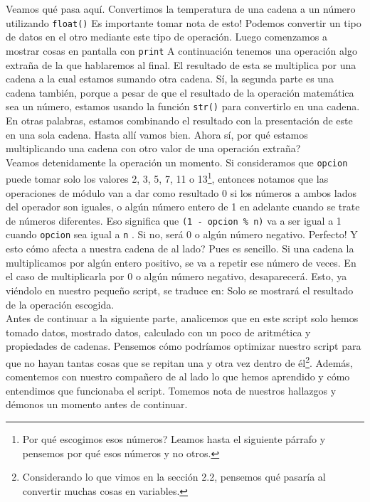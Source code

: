 \documentclass[10pt,letterpaper]{article}
\newcommand{\inlinecode}[1]{
\colorbox{light-gray}{\texttt{#1}}
}
\begin{document}
Veamos qu\'e pasa aqu\'i. Convertimos la temperatura de una cadena a un n\'umero utilizando \inlinecode{float()} Es importante tomar nota de esto! Podemos convertir un tipo de datos en el otro mediante este tipo de operaci\'on. Luego comenzamos a mostrar cosas en pantalla con \inlinecode{print} A continuaci\'on tenemos una operaci\'on algo extra\~na de la que hablaremos al final. El resultado de esta se multiplica por una cadena a la cual estamos sumando otra cadena. S\'i, la segunda parte es una cadena tambi\'en, porque a pesar de que el resultado de la operaci\'on matem\'atica sea un n\'umero, estamos usando la funci\'on \inlinecode{str()} para convertirlo en una cadena. En otras palabras, estamos combinando el resultado con la presentaci\'on de este en una sola cadena. Hasta all\'i vamos bien. Ahora s\'i, por qu\'e estamos multiplicando una cadena con otro valor de una operaci\'on extra\~na?\\

Veamos detenidamente la operaci\'on un momento. Si consideramos que \inlinecode{opcion} puede tomar solo los valores 2, 3, 5, 7, 11 o 13\footnote{Por qu\'e escogimos esos n\'umeros? Leamos hasta el siguiente p\'arrafo y pensemos por qu\'e esos n\'umeros y no otros.}, entonces notamos que las operaciones de m\'odulo van a dar como resultado 0 si los n\'umeros a ambos lados del operador son iguales, o alg\'un n\'umero entero de 1 en adelante cuando se trate de n\'umeros diferentes. Eso significa que \inlinecode{(1 - opcion \% n)} va a ser igual a 1 cuando \inlinecode{opcion} sea igual a \inlinecode{n}. Si no, ser\'a 0 o alg\'un n\'umero negativo. Perfecto! Y esto c\'omo afecta a nuestra cadena de al lado? Pues es sencillo. Si una cadena la multiplicamos por alg\'un entero positivo, se va a repetir ese n\'umero de veces. En el caso de multiplicarla por 0 o alg\'un n\'umero negativo, desaparecer\'a. Esto, ya vi\'endolo en nuestro peque\~no script, se traduce en: Solo se mostrar\'a el resultado de la operaci\'on escogida.\\

Antes de continuar a la siguiente parte, analicemos que en este script solo hemos tomado datos, mostrado datos, calculado con un poco de aritm\'etica y propiedades de cadenas. Pensemos c\'omo podr\'iamos optimizar nuestro script para que no hayan tantas cosas que se repitan una y otra vez dentro de \'el\footnote{Considerando lo que vimos en la secci\'on 2.2, pensemos qu\'e pasar\'ia al convertir muchas cosas en variables.}. Adem\'as, comentemos con nuestro compa\~nero de al lado lo que hemos aprendido y c\'omo entendimos que funcionaba el script. Tomemos nota de nuestros hallazgos y d\'emonos un momento antes de continuar.
\end{document}
